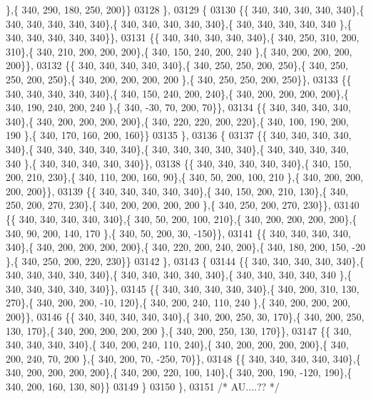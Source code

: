 \begin{DoxyCode}
      \},\{ 340, 290, 180, 250, 200\}\}
03128 \},
03129 \{
03130 \{\{ 340, 340, 340, 340, 340\},\{ 340, 340, 340, 340, 340\},\{ 340, 340, 340, 340, 340\},\{ 340, 340, 340, 340, 340
      \},\{ 340, 340, 340, 340, 340\}\},
03131 \{\{ 340, 340, 340, 340, 340\},\{ 340, 250, 310, 200, 310\},\{ 340, 210, 200, 200, 200\},\{ 340, 150, 240, 200, 240
      \},\{ 340, 200, 200, 200, 200\}\},
03132 \{\{ 340, 340, 340, 340, 340\},\{ 340, 250, 250, 200, 250\},\{ 340, 250, 250, 200, 250\},\{ 340, 200, 200, 200, 200
      \},\{ 340, 250, 250, 200, 250\}\},
03133 \{\{ 340, 340, 340, 340, 340\},\{ 340, 150, 240, 200, 240\},\{ 340, 200, 200, 200, 200\},\{ 340, 190, 240, 200, 240
      \},\{ 340, -30,  70, 200,  70\}\},
03134 \{\{ 340, 340, 340, 340, 340\},\{ 340, 200, 200, 200, 200\},\{ 340, 220, 220, 200, 220\},\{ 340, 100, 190, 200, 190
      \},\{ 340, 170, 160, 200, 160\}\}
03135 \},
03136 \{
03137 \{\{ 340, 340, 340, 340, 340\},\{ 340, 340, 340, 340, 340\},\{ 340, 340, 340, 340, 340\},\{ 340, 340, 340, 340, 340
      \},\{ 340, 340, 340, 340, 340\}\},
03138 \{\{ 340, 340, 340, 340, 340\},\{ 340, 150, 200, 210, 230\},\{ 340, 110, 200, 160,  90\},\{ 340,  50, 200, 100, 210
      \},\{ 340, 200, 200, 200, 200\}\},
03139 \{\{ 340, 340, 340, 340, 340\},\{ 340, 150, 200, 210, 130\},\{ 340, 250, 200, 270, 230\},\{ 340, 200, 200, 200, 200
      \},\{ 340, 250, 200, 270, 230\}\},
03140 \{\{ 340, 340, 340, 340, 340\},\{ 340,  50, 200, 100, 210\},\{ 340, 200, 200, 200, 200\},\{ 340,  90, 200, 140, 170
      \},\{ 340,  50, 200,  30, -150\}\},
03141 \{\{ 340, 340, 340, 340, 340\},\{ 340, 200, 200, 200, 200\},\{ 340, 220, 200, 240, 200\},\{ 340, 180, 200, 150, -20
      \},\{ 340, 250, 200, 220, 230\}\}
03142 \},
03143 \{
03144 \{\{ 340, 340, 340, 340, 340\},\{ 340, 340, 340, 340, 340\},\{ 340, 340, 340, 340, 340\},\{ 340, 340, 340, 340, 340
      \},\{ 340, 340, 340, 340, 340\}\},
03145 \{\{ 340, 340, 340, 340, 340\},\{ 340, 200, 310, 130, 270\},\{ 340, 200, 200, -10, 120\},\{ 340, 200, 240, 110, 240
      \},\{ 340, 200, 200, 200, 200\}\},
03146 \{\{ 340, 340, 340, 340, 340\},\{ 340, 200, 250,  30, 170\},\{ 340, 200, 250, 130, 170\},\{ 340, 200, 200, 200, 200
      \},\{ 340, 200, 250, 130, 170\}\},
03147 \{\{ 340, 340, 340, 340, 340\},\{ 340, 200, 240, 110, 240\},\{ 340, 200, 200, 200, 200\},\{ 340, 200, 240,  70, 200
      \},\{ 340, 200,  70, -250,  70\}\},
03148 \{\{ 340, 340, 340, 340, 340\},\{ 340, 200, 200, 200, 200\},\{ 340, 200, 220, 100, 140\},\{ 340, 200, 190, -120, 
      190\},\{ 340, 200, 160, 130,  80\}\}
03149 \}
03150 \},
03151 \textcolor{comment}{/* AU....?? */}

\end{DoxyCode}
